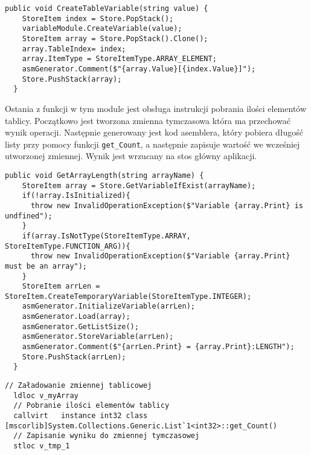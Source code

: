 \begin{lstlisting}[language=CSharp, caption={Implementacja funkcji obsługująca wystąpienie elementu tablicowego}, label=alg:array4]
  public void CreateTableVariable(string value) {
    StoreItem index = Store.PopStack();
    variableModule.CreateVariable(value);
    StoreItem array = Store.PopStack().Clone();
    array.TableIndex= index;
    array.ItemType = StoreItemType.ARRAY_ELEMENT;
    asmGenerator.Comment($"{array.Value}[{index.Value}]");
    Store.PushStack(array);
  }
\end{lstlisting}

\par Ostania z funkcji w tym module jest obsługa instrukcji pobrania ilości elementów tablicy. Początkowo jest tworzona zmienna tymczasowa która ma przechować wynik operacji. Następnie generowany jest kod asemblera, który pobiera długość listy przy pomocy funkcji \texttt{get\_Count}, a następnie zapisuje wartość we wcześniej utworzonej zmiennej. Wynik jest wrzucany na stos główny aplikacji.

\begin{lstlisting}[language=CSharp, caption={Implementacja funkcji obsługująca pobieranie ilości elementów tablicy}, label=alg:array5]
  public void GetArrayLength(string arrayName) {
    StoreItem array = Store.GetVariableIfExist(arrayName);
    if(!array.IsInitialized){
      throw new InvalidOperationException($"Variable {array.Print} is undfined");
    }
    if(array.IsNotType(StoreItemType.ARRAY, StoreItemType.FUNCTION_ARG)){
      throw new InvalidOperationException($"Variable {array.Print} must be an array");
    }
    StoreItem arrLen = StoreItem.CreateTemporaryVariable(StoreItemType.INTEGER);
    asmGenerator.InitializeVariable(arrLen);
    asmGenerator.Load(array);
    asmGenerator.GetListSize();
    asmGenerator.StoreVariable(arrLen);
    asmGenerator.Comment($"{arrLen.Print} = {array.Print}:LENGTH");
    Store.PushStack(arrLen);
  }
\end{lstlisting}

\begin{lstlisting}[language=IL, caption={Kod assemblera przedstawiający pobieranie ilości elementów tablicy}, label=alg:array6]
  // Załadowanie zmiennej tablicowej
  ldloc v_myArray
  // Pobranie ilości elementów tablicy
  callvirt   instance int32 class [mscorlib]System.Collections.Generic.List`1<int32>::get_Count()
  // Zapisanie wyniku do zmiennej tymczasowej
  stloc v_tmp_1
\end{lstlisting}

